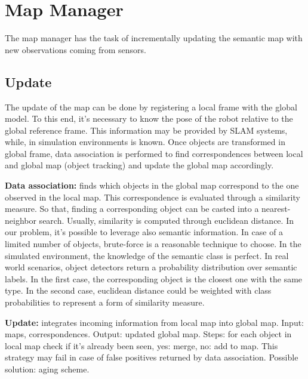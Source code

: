 \documentclass{article}
\begin{document}
	\section*{Map Manager}
	
	The map manager has the task of incrementally updating the semantic map with new observations coming from sensors.
	
	\subsection*{Update}
	
	The update of the map can be done by registering a local frame with the global model. To this end, it's necessary to know the pose of the robot relative to the global reference frame. This information may be provided by SLAM systems, while, in simulation environments is known. Once objects are transformed in global frame, data association is performed to find correspondences between local and global map (object tracking) and update the global map accordingly.
	
	\begin{description}
		\item{\bf Data association:} finds which objects in the global map correspond to the one observed in the local map. This correspondence is evaluated through a similarity measure. So that, finding a corresponding object can be casted into a nearest-neighbor search. Usually, similarity is computed through euclidean distance. In our problem, it's possible to leverage also semantic information. In case of a limited number of objects, brute-force is a reasonable technique to choose. In the simulated environment, the knowledge of the semantic class is perfect. In real world scenarios, object detectors return a probability distribution over semantic labels. In the first case, the corresponding object is the closest one with the same type. In the second case, euclidean distance could be weighted with class probabilities to represent a form of similarity measure.
		
		\item{\bf Update:} integrates incoming information from local map into global map. Input: maps, correspondences. Output: updated global map. Steps: for each object in local map check if it's already been seen, yes: merge, no: add to map. This strategy may fail in case of false positives returned by data association. Possible solution:  aging scheme.
	\end{description}
	
\end{document}
